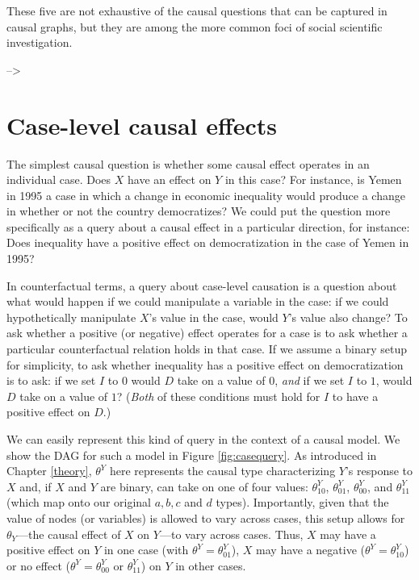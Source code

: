 \documentclass[12pt,]{book}
\begin{document}
These five are not exhaustive of the causal questions that can be captured in causal graphs, but they are among the more common foci of social scientific investigation.

--\textgreater{}

\hypertarget{case-level-causal-effects}{%
\section{Case-level causal effects}\label{case-level-causal-effects}}

The simplest causal question is whether some causal effect operates in an individual case. Does \(X\) have an effect on \(Y\) in this case? For instance, is Yemen in 1995 a case in which a change in economic inequality would produce a change in whether or not the country democratizes? We could put the question more specifically as a query about a causal effect in a particular direction, for instance: Does inequality have a positive effect on democratization in the case of Yemen in 1995?

In counterfactual terms, a query about case-level causation is a question about what would happen if we could manipulate a variable in the case: if we could hypothetically manipulate \(X\)'s value in the case, would \(Y\)'s value also change? To ask whether a positive (or negative) effect operates for a case is to ask whether a particular counterfactual relation holds in that case. If we assume a binary setup for simplicity, to ask whether inequality has a positive effect on democratization is to ask: if we set \(I\) to \(0\) would \(D\) take on a value of \(0\), \emph{and} if we set \(I\) to \(1\), would \(D\) take on a value of \(1\)? (\emph{Both} of these conditions must hold for \(I\) to have a positive effect on \(D\).)

We can easily represent this kind of query in the context of a causal model. We show the DAG for such a model in Figure \ref{fig:casequery}. As introduced in Chapter \ref{theory}, \(\theta^Y\) here represents the causal type characterizing \(Y\)'s response to \(X\) and, if \(X\) and \(Y\) are binary, can take on one of four values: \(\theta^Y_{10}\), \(\theta^Y_{01}\), \(\theta^Y_{00}\), and \(\theta^Y_{11}\) (which map onto our original \(a, b, c\) and \(d\) types). Importantly, given that the value of nodes (or variables) is allowed to vary across cases, this setup allows for \(\theta_Y\)---the causal effect of \(X\) on \(Y\)---to vary across cases. Thus, \(X\) may have a positive effect on \(Y\) in one case (with \(\theta^Y=\theta^Y_{01}\)), \(X\) may have a negative (\(\theta^Y=\theta^Y_{10}\)) or no effect (\(\theta^Y=\theta^Y_{00}\) or \(\theta^Y_{11}\)) on \(Y\) in other cases.
\end{document}
